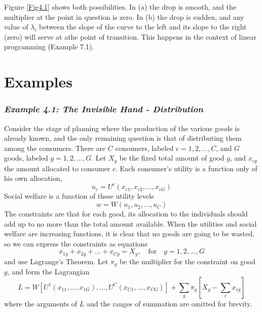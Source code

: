 Figure \ref{Fig4.1} shows both possibilities. In (a) the drop is smooth, and the multiplier at the point in question is zero. In (b) the drop is sudden, and any value of $\lambda_i$ between the slope of the curve to the left and its slope to the right (zero) will serve at athe point of transition. This happens in the context of linear programming (Example 7.1).

\section*{Examples}

\subsubsection*{\textit{Example 4.1: The Invisible Hand - Distribution}}

Consider the stage of planning where the production of the various goods is already known, and the only remaining question is that of distributing them among the consumers. There are $C$ consumers, labeled $c=1,2,\dots, C$, and $G$ goods, labeled $g=1,2,\dots,G$. Let $X_g$ be the fixed total amount of good $g$, and $x_{cg}$ the amount allocated to consumer $c$. Each consumer's utility is a function only of his own allocation,
\begin{equation} \label{equa4.3}
u_c = U^c(x_{c1}, x_{c2}, \dots, x_{cG}    )
\end{equation}
Social welfare is a function of these utility levels
\begin{equation*}
w = W(u_{1}, u_{2}, \dots, u_{C}    )
\end{equation*}
The constraints are that for each good, its allocation to the individuals should add up to no more than the total amount available. When the utilities and social welfare are increasing functions, it is clear that no goods are going to be wasted, so we can express the constraints as equations
\begin{equation} \label{equa4.4}
 x_{1g} + x_{2g} + \dots + x_{Cg} = X_g, \quad \mbox{for} \quad g=1,2,\dots,G
\end{equation}
and use Lagrange's Theorem. Let $\pi_g$ be the multiplier for the constraint on good $g$, and form the Lagrangian
\begin{equation*}
L = W[ U^1(x_{11}, \dots, x_{1G}  ), \dots, U^C(  x_{C1}, \dots, x_{CG}  ) ] + \sum_g \pi_g [X_g - \sum_c x_{cg} ]
\end{equation*}
where the arguments of $L$ and the ranges of summation are omitted for brevity.

